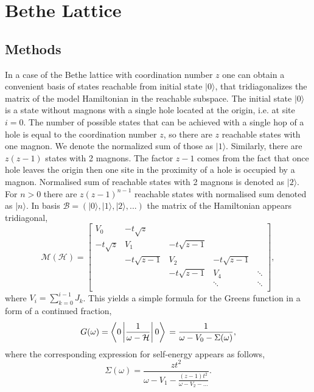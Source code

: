 \documentclass[%
 reprint,
 amsmath,amssymb,
 aps,
prb,
floatfix,
]{revtex4-1}
\newcommand{\ket}[1]{\lvert#1\rangle}
\begin{document}
\section{Bethe Lattice}
\subsection{Methods}

In a case of the Bethe lattice with coordination number $z$ one can obtain a convenient basis of states reachable from initial state $\ket{0}$, that tridiagonalizes the matrix of the model Hamiltonian in the reachable subspace. The initial state $\ket{0}$ is a state without magnons with a single hole located at the origin, i.e. at site $i = 0$. The number of possible states that can be achieved with a single hop of a hole is equal to the coordination number $z$, so there are $z$ reachable states with one magnon. We denote the normalized sum of those as $\ket{1}$. Similarly, there are $z(z-1)$ states with 2 magnons. The factor $z-1$ comes from the fact that once hole leaves the origin then one site in the proximity of a hole is occupied by a magnon. Normalised sum of reachable states with 2 magnons is denoted as $\ket{2}$. For $n > 0$ there are $z(z-1)^{n-1}$ reachable states with normalised sum denoted as $\ket{n}$. In basis $\mathcal{B} = (\ket{0}, \ket{1}, \ket{2}, ...)$ the matrix of the Hamiltonian appears tridiagonal,
\begin{equation}
\mathcal{M}(\mathcal{H})=\begin{bmatrix}
V_0 & -t\sqrt{z} &  &  &  \\
-t\sqrt{z} & V_1 & -t\sqrt{z-1} &  &  \\
 & -t\sqrt{z-1} & V_2 & -t\sqrt{z-1}&  \\
 &  &  -t\sqrt{z-1} & V_4 & \ddots \\
 &  &  & \ddots & \ddots \\
\end{bmatrix},
\end{equation}
where $V_i = \sum_{k=0}^{i-1} J_k$. This yields a simple formula for the Greens function in a form of a continued fraction,
\begin{equation}
G(\omega) = \left\langle 0 \left| \frac{1}{\omega - \mathcal{H}} \right| 0 \right\rangle \\
= \frac{1}{\omega - V_0 - \Sigma(\omega)},
\end{equation} 
where the corresponding expression for self-energy appears as follows,
\begin{equation}
\Sigma(\omega) = \frac{zt^2}{\omega - V_1 - \frac{(z-1)t^2}{\omega - V_2 - \hdots}}.
\end{equation}
\end{document}
